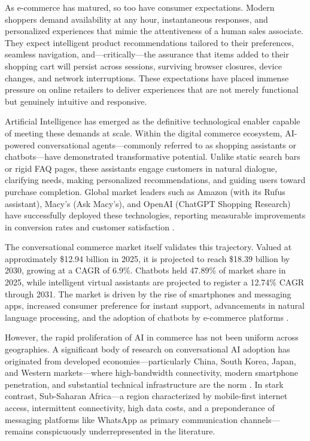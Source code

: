 \documentclass[12pt,a4paper]{article}
\begin{document}
As e-commerce has matured, so too have consumer expectations. Modern shoppers demand availability at any hour, instantaneous responses, and personalized experiences that mimic the attentiveness of a human sales associate. They expect intelligent product recommendations tailored to their preferences, seamless navigation, and---critically---the assurance that items added to their shopping cart will persist across sessions, surviving browser closures, device changes, and network interruptions. These expectations have placed immense pressure on online retailers to deliver experiences that are not merely functional but genuinely intuitive and responsive.

Artificial Intelligence has emerged as the definitive technological enabler capable of meeting these demands at scale. Within the digital commerce ecosystem, AI-powered conversational agents---commonly referred to as shopping assistants or chatbots---have demonstrated transformative potential. Unlike static search bars or rigid FAQ pages, these assistants engage customers in natural dialogue, clarifying needs, making personalized recommendations, and guiding users toward purchase completion. Global market leaders such as Amazon (with its Rufus assistant), Macy's (Ask Macy's), and OpenAI (ChatGPT Shopping Research) have successfully deployed these technologies, reporting measurable improvements in conversion rates and customer satisfaction \citep{amazon2025, dagtekin2026}.

The conversational commerce market itself validates this trajectory. Valued at approximately \$12.94 billion in 2025, it is projected to reach \$18.39 billion by 2030, growing at a CAGR of 6.9\%. Chatbots held 47.89\% of market share in 2025, while intelligent virtual assistants are projected to register a 12.74\% CAGR through 2031. The market is driven by the rise of smartphones and messaging apps, increased consumer preference for instant support, advancements in natural language processing, and the adoption of chatbots by e-commerce platforms \citep{marketsandmarkets2025, grandview2025}.

However, the rapid proliferation of AI in commerce has not been uniform across geographies. A significant body of research on conversational AI adoption has originated from developed economies---particularly China, South Korea, Japan, and Western markets---where high-bandwidth connectivity, modern smartphone penetration, and substantial technical infrastructure are the norm \citep{sharma2025, lopez2025}. In stark contrast, Sub-Saharan Africa---a region characterized by mobile-first internet access, intermittent connectivity, high data costs, and a preponderance of messaging platforms like WhatsApp as primary communication channels---remains conspicuously underrepresented in the literature.
\end{document}
